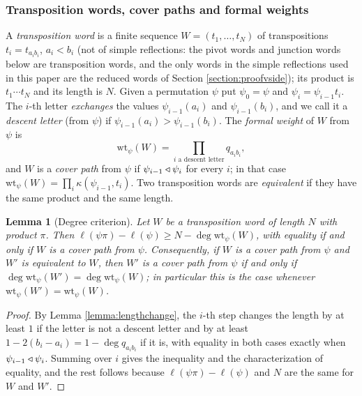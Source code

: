 \documentclass{amsart}
\newtheorem{lemma}{Lemma}[section]
\theoremstyle{definition}
\theoremstyle{remark}
\numberwithin{equation}{section}
\begin{document}
\subsubsection*{Transposition words, cover paths and formal weights}
A \emph{transposition word} is a finite sequence $W=(t_1,\ldots,t_N)$ of transpositions $t_i=t_{a_ib_i}$, $a_i<b_i$ (not of simple reflections: the pivot words and junction words below are transposition words, and the only words in the simple reflections used in this paper are the reduced words of Section \ref{section:proofvside}); its product is $t_1\cdots t_N$ and its length is $N$. Given a permutation $\psi$ put $\psi_0=\psi$ and $\psi_i=\psi_{i-1}t_i$. The $i$-th letter \emph{exchanges} the values $\psi_{i-1}(a_i)$ and $\psi_{i-1}(b_i)$, and we call it a \emph{descent letter} (from $\psi$) if $\psi_{i-1}(a_i)>\psi_{i-1}(b_i)$. The \emph{formal weight} of $W$ from $\psi$ is
$$\mathrm{wt}_\psi(W)=\prod_{i\text{ a descent letter}}q_{a_ib_i},$$
and $W$ is a \emph{cover path} from $\psi$ if $\psi_{i-1}\triangleleft\psi_i$ for every $i$; in that case $\mathrm{wt}_\psi(W)=\prod_i\kappa(\psi_{i-1},t_i)$. Two transposition words are \emph{equivalent} if they have the same product and the same length.

\begin{lemma}[Degree criterion] \label{lemma:degree}
Let $W$ be a transposition word of length $N$ with product $\pi$. Then $\ell(\psi\pi)-\ell(\psi)\geq N-\deg\mathrm{wt}_\psi(W)$, with equality if and only if $W$ is a cover path from $\psi$. Consequently, if $W$ is a cover path from $\psi$ and $W'$ is equivalent to $W$, then $W'$ is a cover path from $\psi$ if and only if $\deg\mathrm{wt}_\psi(W')=\deg\mathrm{wt}_\psi(W)$; in particular this is the case whenever $\mathrm{wt}_\psi(W')=\mathrm{wt}_\psi(W)$.
\end{lemma}
\begin{proof}
By Lemma \ref{lemma:lengthchange}, the $i$-th step changes the length by at least $1$ if the letter is not a descent letter and by at least $1-2(b_i-a_i)=1-\deg q_{a_ib_i}$ if it is, with equality in both cases exactly when $\psi_{i-1}\triangleleft\psi_i$. Summing over $i$ gives the inequality and the characterization of equality, and the rest follows because $\ell(\psi\pi)-\ell(\psi)$ and $N$ are the same for $W$ and $W'$.
\end{proof}
\end{document}
